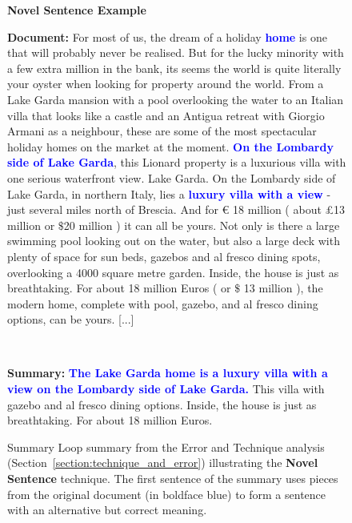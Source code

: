 \documentclass[11pt,a4paper]{article}
\begin{document}
\begin{figure*}[!htbp]
    \begin{framed}
        \begin{center}
            \large
            \textbf{Novel Sentence Example}
        \end{center}

        \textbf{Document:}
        For most of us, the dream of a holiday \textbf{\textcolor{blue}{home}} is one that will probably never be realised. But for the lucky minority with a few extra million in the bank, its seems the world is quite literally your oyster when looking for property around the world. From a Lake Garda mansion with a pool overlooking the water to an Italian villa that looks like a castle and an Antigua retreat with Giorgio Armani as a neighbour, these are some of the most spectacular holiday homes on the market at the moment. \textbf{\textcolor{blue}{On the Lombardy side of Lake Garda}}, this Lionard property is a luxurious villa with one serious waterfront view. Lake Garda. On the Lombardy side of Lake Garda, in northern Italy, lies a \textbf{\textcolor{blue}{luxury villa with a view}} - just several miles north of Brescia. And for \euro{} 18 million ( about \pounds 13 million or $\$$20 million ) it can all be yours. Not only is there a large swimming pool looking out on the water, but also a large deck with plenty of space for sun beds, gazebos and al fresco dining spots, overlooking a 4000 square metre garden. Inside, the house is just as breathtaking. For about 18 million Euros ( or $\$$ 13 million ), the modern home, complete with pool, gazebo, and al fresco dining options, can be yours. [...]
         \begin{center}
            ~
        \end{center}
        \textbf{Summary:}
        \textbf{\textcolor{blue}{The Lake Garda home is a luxury villa with a view on the Lombardy side of Lake Garda.}} This villa with gazebo and al fresco dining options. Inside, the house is just as breathtaking. For about 18 million Euros.
        
    \end{framed}

    \caption{Summary Loop summary from the Error and Technique analysis (Section~\ref{section:technique_and_error}) illustrating the \textbf{Novel Sentence} technique. The first sentence of the summary uses pieces from the original document (in boldface blue) to form a sentence with an alternative but correct meaning.}
    \label{fig:extra_examples3}
\end{figure*}
\end{document}
